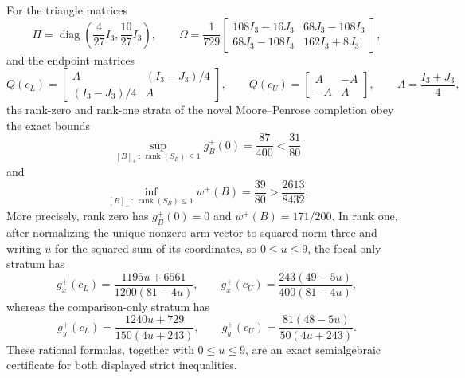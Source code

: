 For the triangle matrices
\[
\Pi=\operatorname{diag}\!\left(\frac4{27}I_3,\frac{10}{27}I_3\right),
\qquad
\Omega=\frac1{729}
\begin{bmatrix}
108I_3-16J_3&68J_3-108I_3\\
68J_3-108I_3&162I_3+8J_3
\end{bmatrix},
\]
and the endpoint matrices
\[
Q(c_L)=
\begin{bmatrix}A&(I_3-J_3)/4\\(I_3-J_3)/4&A\end{bmatrix},
\qquad
Q(c_U)=
\begin{bmatrix}A&-A\\-A&A\end{bmatrix},
\qquad A=\frac{I_3+J_3}{4},
\]
the rank-zero and rank-one strata of the novel Moore--Penrose completion obey the exact bounds
\[
\sup_{[B]_+\,:\,\operatorname{rank}(S_B)\le1}g_B^+(0)
=\frac{87}{400}<\frac{31}{80}
\]
and
\[
\inf_{[B]_+\,:\,\operatorname{rank}(S_B)\le1}w^+(B)
=\frac{39}{80}>\frac{2613}{8432}.
\]
More precisely, rank zero has \(g_B^+(0)=0\) and \(w^+(B)=171/200\).  In rank one, after normalizing the unique nonzero arm vector to squared norm three and writing \(u\) for the squared sum of its coordinates, so \(0\le u\le9\), the focal-only stratum has
\[
g_x^+(c_L)=\frac{1195u+6561}{1200(81-4u)},
\qquad g_x^+(c_U)=\frac{243(49-5u)}{400(81-4u)},
\]
whereas the comparison-only stratum has
\[
g_y^+(c_L)=\frac{1240u+729}{150(4u+243)},
\qquad g_y^+(c_U)=\frac{81(48-5u)}{50(4u+243)}.
\]
These rational formulas, together with \(0\le u\le9\), are an exact semialgebraic certificate for both displayed strict inequalities.